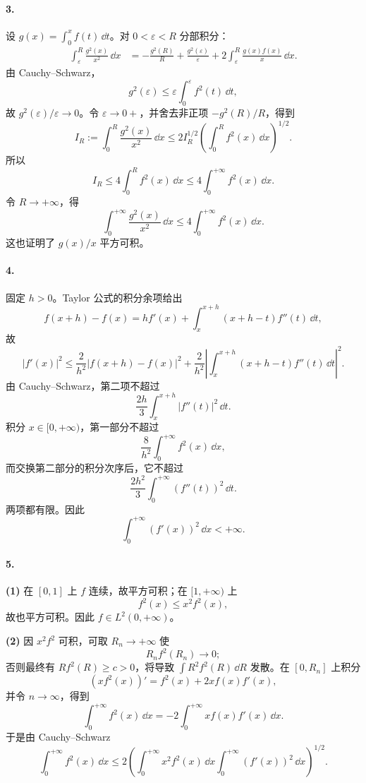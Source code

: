 \paragraph{3.}
设 $g(x)=\int_0^x f(t)\,\dd t$。对 $0<\varepsilon<R$ 分部积分：
\begin{align*}
  \int_\varepsilon^R\frac{g^2(x)}{x^2}\,\dd x
  &=-\frac{g^2(R)}R+\frac{g^2(\varepsilon)}\varepsilon
    +2\int_\varepsilon^R\frac{g(x)f(x)}x\,\dd x.
\end{align*}
由 Cauchy--Schwarz，
\[
  g^2(\varepsilon)
  \leq\varepsilon\int_0^\varepsilon f^2(t)\,\dd t,
\]
故 $g^2(\varepsilon)/\varepsilon\to0$。令 $\varepsilon\to0+$，并舍去非正项 $-g^2(R)/R$，得到
\[
  I_R:=\int_0^R\frac{g^2(x)}{x^2}\,\dd x
  \leq2I_R^{1/2}\left(\int_0^R f^2(x)\,\dd x\right)^{1/2}.
\]
所以
\[
  I_R\leq4\int_0^R f^2(x)\,\dd x
  \leq4\int_0^{+\infty}f^2(x)\,\dd x.
\]
令 $R\to+\infty$，得
\[
  \boxed{\int_0^{+\infty}\frac{g^2(x)}{x^2}\,\dd x
  \leq4\int_0^{+\infty}f^2(x)\,\dd x}.
\]
这也证明了 $g(x)/x$ 平方可积。

\paragraph{4.}
固定 $h>0$。Taylor 公式的积分余项给出
\[
  f(x+h)-f(x)
  =hf'(x)+\int_x^{x+h}(x+h-t)f''(t)\,\dd t,
\]
故
\[
  |f'(x)|^2
  \leq\frac{2}{h^2}|f(x+h)-f(x)|^2
  +\frac{2}{h^2}\left|\int_x^{x+h}(x+h-t)f''(t)\,\dd t\right|^2.
\]
由 Cauchy--Schwarz，第二项不超过
\[
  \frac{2h}{3}\int_x^{x+h}|f''(t)|^2\,\dd t.
\]
积分 $x\in[0,+\infty)$，第一部分不超过
\[
  \frac8{h^2}\int_0^{+\infty}f^2(x)\,\dd x,
\]
而交换第二部分的积分次序后，它不超过
\[
  \frac{2h^2}{3}\int_0^{+\infty}(f''(t))^2\,\dd t.
\]
两项都有限。因此
\[
  \boxed{\int_0^{+\infty}(f'(x))^2\,\dd x<+\infty}.
\]

\paragraph{5.}
\textbf{(1)} 在 $[0,1]$ 上 $f$ 连续，故平方可积；在 $[1,+\infty)$ 上
\[
  f^2(x)\leq x^2f^2(x),
\]
故也平方可积。因此 $f\in L^2(0,+\infty)$。

\textbf{(2)} 因 $x^2f^2$ 可积，可取 $R_n\to+\infty$ 使
\[
  R_nf^2(R_n)\to0;
\]
否则最终有 $Rf^2(R)\geq c>0$，将导致 $\int R^2f^2(R)\,\dd R$ 发散。在 $[0,R_n]$ 上积分
\[
  (xf^2(x))'=f^2(x)+2xf(x)f'(x),
\]
并令 $n\to\infty$，得到
\[
  \int_0^{+\infty}f^2(x)\,\dd x
  =-2\int_0^{+\infty}xf(x)f'(x)\,\dd x.
\]
于是由 Cauchy--Schwarz
\[
  \boxed{
  \int_0^{+\infty}f^2(x)\,\dd x
  \leq2\left(
  \int_0^{+\infty}x^2f^2(x)\,\dd x
  \int_0^{+\infty}(f'(x))^2\,\dd x
  \right)^{1/2}.}
\]

